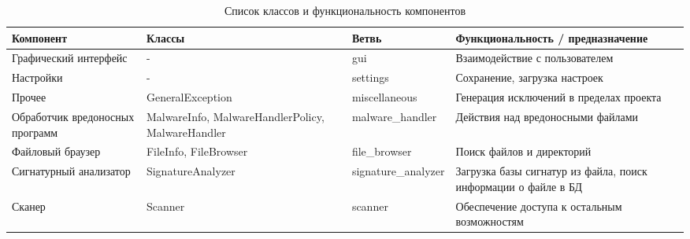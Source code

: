 \begin{table}[h]
\centering
\begin{tabular}{|p{25mm}|p{4cm}|l|p{4cm}|}
\hline
Компонент & Классы & Ветвь & Функциональность / предназначение \\
\hline
Графический интерфейс & - & gui & Взаимодействие с пользователем \\
\hline
Настройки & - & settings & Сохранение, загрузка настроек \\
\hline
Прочее & GeneralException & miscellaneous
& Генерация исключений в пределах проекта \\
\hline
Обработчик вредоносных программ
& MalwareInfo, MalwareHandlerPolicy, MalwareHandler
& malware\_handler & Действия над вредоносными файлами \\
\hline
Файловый браузер & FileInfo, FileBrowser & file\_browser
& Поиск файлов и директорий \\
\hline
Сигнатурный анализатор & SignatureAnalyzer & signature\_analyzer
& Загрузка базы сигнатур из файла, поиск информации о файле в БД \\
\hline
Сканер & Scanner & scanner & Обеспечение доступа к остальным возможностям \\
\hline
\end{tabular}
\caption{Список классов и функциональность компонентов}
\label{table:components}
\end{table}
